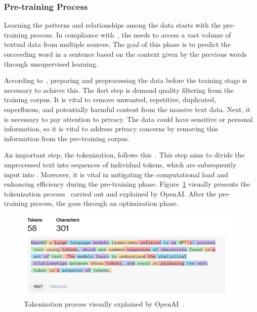 \subsubsection{Pre-training Process}

Learning the patterns and relationships among the data starts with the pre-training process. In compliance with~\citet{min_recent_pretrained}, the {\llm} needs to access a vast volume of textual data from multiple sources. The goal of this phase is to predict the succeeding word in a sentence based on the context given by the previous words through unsupervised learning. 

According to~\citet{hadi_LLM_2023}, preparing and preprocessing the data before the training stage is necessary to achieve this. The fisrt step is demand quality filtering from the training corpus. It is vital to remove unwanted, repetitive, duplicated, superfluous, and potentially harmful content from the massive text data. Next, it is necessary to pay attention to privacy. The data could have sensitive or personal information, so it is vital to address privacy concerns by removing this information from the pre-training corpus.

An important step, the tokenization, follows this~\cite{hadi_LLM_2023}. This step aims to divide the unprocessed text into sequences of individual tokens, which are subsequently input into {\llm}. Moreover, it is vital in mitigating the computational load and enhancing efficiency during the pre-training phase. Figure~\ref{fig_tokenization} visually presents the tokenization process~\cite{noauthor_openai_nodate} carried out and explained by OpenAI. After the pre-training process, the {\llm} goes through an optimization phase.

\begin{figure}[ht]
    \includegraphics[width=14cm]{figs/chapter2/tokenization.png}
    \centering
    \caption[Tokenization process visually explained]{Tokenization process visually explained by OpenAI~\cite{noauthor_openai_nodate}.}
    \label{fig_tokenization}
\end{figure}



